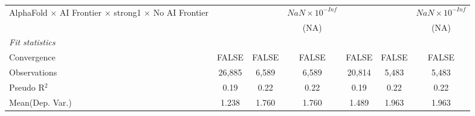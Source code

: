 \begin{tabular}{lcccccc}
   AlphaFold $\times$ AI Frontier $\times$ strong1 $\times$ No AI Frontier    &                        &                        & $NaN\times 10^{-Inf}$  &                        &                        & $NaN\times 10^{-Inf}$\\    
                                                                              &                        &                        & (NA)                   &                        &                        & (NA)\\   
   \midrule
   \emph{Fit statistics}\\
   Convergence                                                                &FALSE                   & FALSE                  & FALSE                  & FALSE                  & FALSE                  & FALSE\\  
   Observations                                                               & 26,885                 & 6,589                  & 6,589                  & 20,814                 & 5,483                  & 5,483\\  
   Pseudo R$^2$                                                               & 0.19                   & 0.22                   & 0.22                   & 0.19                   & 0.22                   & 0.22\\  
Mean(Dep. Var.) & 1.238 & 1.760 & 1.760 & 1.489 & 1.963 & 1.963 \\
   

\end{tabular}
